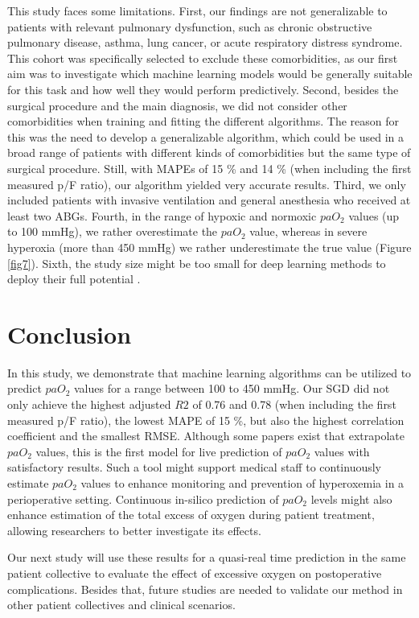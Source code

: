 \documentclass[referee,lineno,pdflatex,sn-nature]{sn-jnl}%
\theoremstyle{thmstyleone}%
\theoremstyle{thmstyletwo}%
\theoremstyle{thmstylethree}%
\begin{document}
\label{limitations}This study faces some limitations. First, our findings are not generalizable to patients with relevant pulmonary dysfunction, such as chronic obstructive pulmonary disease, asthma, lung cancer, or acute respiratory distress syndrome. This cohort was specifically selected to exclude these comorbidities, as our first aim was to investigate which machine learning models would be generally suitable for this task and how well they would perform predictively. Second, besides the surgical procedure and the main diagnosis, we did not consider other comorbidities when training and fitting the different algorithms. The reason for this was the need to develop a generalizable algorithm, which could be used in a broad range of patients with different kinds of comorbidities but the same type of surgical procedure. Still, with MAPEs of 15 \% and 14 \% (when including the first measured p/F ratio), our algorithm yielded very accurate results. Third, we only included patients with invasive ventilation and general anesthesia who received at least two ABGs. Fourth, in the range of hypoxic and normoxic $paO_2$ values (up to 100 mmHg), we rather overestimate the $paO_2$ value, whereas in severe hyperoxia (more than 450 mmHg) we rather underestimate the true value (Figure \ref{fig7}). Sixth, the study size might be too small for deep learning methods to deploy their full potential \cite{Benkendorf2020,Liu2017}. 

\section{Conclusion}\label{sec5}
In this study, we demonstrate that machine learning algorithms can be utilized to predict $paO_2$ values for a range between 100 to 450 mmHg. Our SGD did not only achieve the highest adjusted $R2$ of 0.76 and 0.78 (when including the first measured p/F ratio), the lowest MAPE of 15 \%, but also the highest correlation coefficient and the smallest RMSE. Although some papers exist that extrapolate $paO_2$ values, this is the first model for live prediction of $paO_2$ values with satisfactory results. Such a tool might support medical staff to continuously estimate $paO_2$ values to enhance monitoring and prevention of hyperoxemia in a perioperative setting. Continuous in-silico prediction of $paO_2$ levels might also enhance estimation of the total excess of oxygen during patient treatment, allowing researchers to better investigate its effects.

Our next study will use these results for a quasi-real time prediction in the same patient collective to evaluate the effect of excessive oxygen on postoperative complications. Besides that, future studies are needed to validate our method in other patient collectives and clinical scenarios. 
\end{document}
